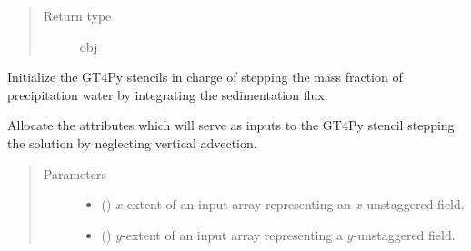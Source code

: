 \documentclass[letterpaper,10pt,english]{sphinxmanual}
\begin{document}
\begin{fulllineitems}
\begin{fulllineitems}
\begin{quote}
\begin{description}
\item[{Return type}] \leavevmode
obj

\end{description}\end{quote}

\end{fulllineitems}


\begin{fulllineitems}
\label{\detokenize{api:dycore.prognostic_isentropic_nonconservative_centered.PrognosticIsentropicNonconservativeCentered._stencils_stepping_by_integrating_sedimentation_flux_initialize}}
Initialize the GT4Py stencils in charge of stepping the mass fraction of precipitation water by
integrating the sedimentation flux.

\end{fulllineitems}


\begin{fulllineitems}
\label{\detokenize{api:dycore.prognostic_isentropic_nonconservative_centered.PrognosticIsentropicNonconservativeCentered._stencils_stepping_by_neglecting_vertical_advection_allocate_inputs}}
Allocate the attributes which will serve as inputs to the GT4Py stencil stepping the solution
by neglecting vertical advection.
\begin{quote}\begin{description}
\item[{Parameters}] \leavevmode\begin{itemize}
\item {} 
 () \textendash{} \(x\)-extent of an input array representing an \(x\)-unstaggered field.

\item {} 
 () \textendash{} \(y\)-extent of an input array representing a \(y\)-unstaggered field.


\end{itemize}
\end{description}
\end{quote}
\end{fulllineitems}
\end{fulllineitems}
\end{document}

